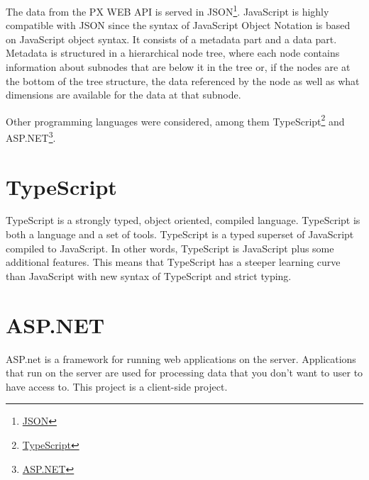 The data from the PX WEB API is served in JSON\footnote{\href{https://json.org/}{JSON}\label{json}}. JavaScript is highly compatible with JSON since the syntax of JavaScript Object Notation is based on JavaScript object syntax. It  consists of a metadata part and a data part. Metadata is structured in a hierarchical node tree, where each node contains information about subnodes that are below it in the tree or, if the nodes are at the bottom of the tree structure, the data referenced by the node as well as what dimensions are available for the data at that subnode.

Other programming languages were considered, among them TypeScript\footnote{\href{https://www.typescriptlang.org/}{TypeScript}\label{typescript}} and ASP.NET\footnote{\href{https://dotnet.microsoft.com/apps/aspnet}{ASP.NET}\label{asp.net}}.

\section{TypeScript}

TypeScript is a strongly typed, object oriented, compiled language. TypeScript is both a language and a set of tools. TypeScript is a typed superset of JavaScript compiled to JavaScript. In other words, TypeScript is JavaScript plus some additional features. This means that TypeScript has a steeper learning curve than JavaScript with new syntax of TypeScript and strict typing.

\section{ASP.NET}

ASP.net is a framework for running web applications on the server. Applications that run on the server are used for processing data that you don't want to user to have access to. This project is a client-side project.




